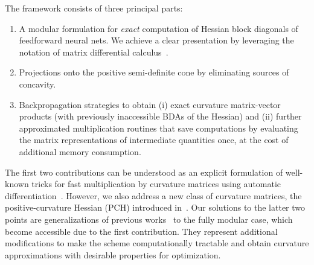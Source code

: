 The framework consists of three principal parts:
\begin{enumerate}
\item A modular formulation for \emph{exact} computation of Hessian block
  diagonals of feedforward neural nets. We achieve a clear presentation by
  leveraging the notation of matrix differential
  calculus~\citep{magnus1999MatrixDifferentialCalculus}.
\item Projections onto the positive semi-definite cone by eliminating sources of
  concavity.
\item Backpropagation strategies to obtain (i) exact curvature matrix-vector
  products (with previously inaccessible BDAs of the Hessian) and (ii) further
  approximated multiplication routines that save computations by evaluating the
  matrix representations of intermediate quantities once, at the cost of
  additional memory consumption.
\end{enumerate}
The first two contributions can be understood as an explicit formulation of
well-known tricks for fast multiplication by curvature matrices using automatic
differentiation~\citep{pearlmutter1994fast,schraudolph2002fast}. However, we
also address a new class of curvature matrices, the positive-curvature Hessian
(PCH) introduced in~\cite{wei2018bdapch}. Our solutions to the latter two points
are generalizations of previous works~\citep{botev2017practical,wei2018bdapch}
to the fully modular case, which become accessible due to the first
contribution. They represent additional modifications to make the scheme
computationally tractable and obtain curvature approximations with desirable
properties for optimization.

